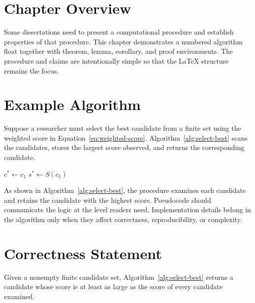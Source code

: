 \section{Chapter Overview}

Some dissertations need to present a computational procedure and establish properties of that procedure. This chapter demonstrates a numbered algorithm float together with theorem, lemma, corollary, and proof environments. The procedure and claims are intentionally simple so that the LaTeX structure remains the focus.

\section{Example Algorithm}

Suppose a researcher must select the best candidate from a finite set using the weighted score in Equation~\eqref{eq:weighted-score}. Algorithm~\ref{alg:select-best} scans the candidates, stores the largest score observed, and returns the corresponding candidate.

\begin{algorithm}[ht]
\caption{Select the Candidate with the Largest Score}
\label{alg:select-best}


\BlankLine

$c^* \leftarrow c_1$\;
$s^* \leftarrow S(c_1)$\;


\;

\end{algorithm}

As shown in Algorithm~\ref{alg:select-best}, the procedure examines each candidate and retains the candidate with the highest score.
Pseudocode should communicate the logic at the level readers need.
Implementation details belong in the algorithm only when they affect correctness, reproducibility, or complexity.

\section{Correctness Statement}

\begin{theorem}
\label{thm:maximum}
Given a nonempty finite candidate set, Algorithm~\ref{alg:select-best} returns a candidate whose score is at least as large as the score of every candidate examined.
\end{theorem}

